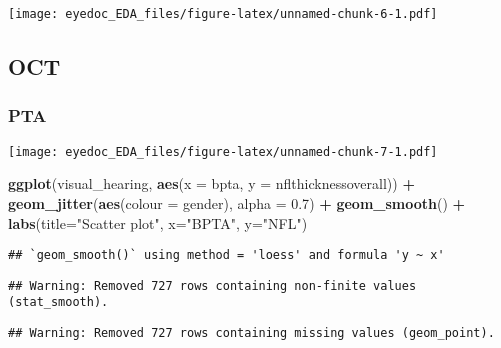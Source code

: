 \documentclass[]{article}
\newenvironment{Shaded}{\begin{snugshade}}{\end{snugshade}}
\newcommand{\DataTypeTok}[1]{\textcolor[rgb]{0.13,0.29,0.53}{#1}}
\newcommand{\FloatTok}[1]{\textcolor[rgb]{0.00,0.00,0.81}{#1}}
\newcommand{\KeywordTok}[1]{\textcolor[rgb]{0.13,0.29,0.53}{\textbf{#1}}}
\newcommand{\NormalTok}[1]{#1}
\newcommand{\OperatorTok}[1]{\textcolor[rgb]{0.81,0.36,0.00}{\textbf{#1}}}
\newcommand{\StringTok}[1]{\textcolor[rgb]{0.31,0.60,0.02}{#1}}
\begin{document}
\texttt{[image: eyedoc\_EDA\_files/figure-latex/unnamed-chunk-6-1.pdf]}

\hypertarget{oct}{%
\subsection{OCT}\label{oct}}

\hypertarget{pta}{%
\subsubsection{PTA}\label{pta}}

\begin{Shaded}
\end{Shaded}

\texttt{[image: eyedoc\_EDA\_files/figure-latex/unnamed-chunk-7-1.pdf]}

\begin{Shaded}
\begin{Highlighting}[]
\KeywordTok{ggplot}\NormalTok{(visual_hearing, }\KeywordTok{aes}\NormalTok{(}\DataTypeTok{x =}\NormalTok{ bpta, }\DataTypeTok{y =}\NormalTok{ nflthicknessoverall)) }\OperatorTok{+}
\StringTok{    }\KeywordTok{geom_jitter}\NormalTok{(}\KeywordTok{aes}\NormalTok{(}\DataTypeTok{colour =}\NormalTok{ gender), }\DataTypeTok{alpha =} \FloatTok{0.7}\NormalTok{) }\OperatorTok{+}
\StringTok{    }\KeywordTok{geom_smooth}\NormalTok{() }\OperatorTok{+}
\StringTok{    }\KeywordTok{labs}\NormalTok{(}\DataTypeTok{title=}\StringTok{"Scatter plot"}\NormalTok{, }\DataTypeTok{x=}\StringTok{"BPTA"}\NormalTok{, }\DataTypeTok{y=}\StringTok{"NFL"}\NormalTok{)}
\end{Highlighting}
\end{Shaded}

\begin{verbatim}
## `geom_smooth()` using method = 'loess' and formula 'y ~ x'
\end{verbatim}

\begin{verbatim}
## Warning: Removed 727 rows containing non-finite values (stat_smooth).
\end{verbatim}

\begin{verbatim}
## Warning: Removed 727 rows containing missing values (geom_point).
\end{verbatim}
\end{document}
